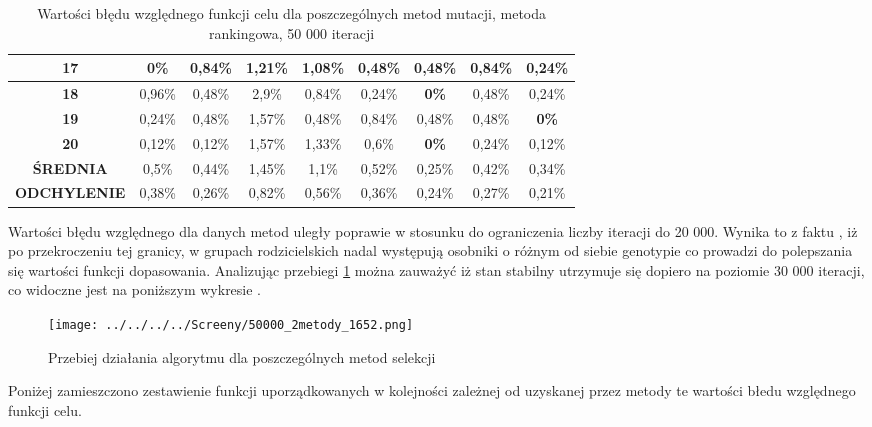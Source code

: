 \begin{itemize}
\begin{table}[h!]
\begin{center}
{\begin{tabular}{|c|c|c|c|c|c|c|c|c|}
\hline
 \textbf{17}&\color{green}\textbf{0\%}&0,84\%&1,21\%&1,08\%&0,48\%&0,48\%&0,84\%&0,24\%\\
\hline
 \textbf{18}&0,96\%&0,48\%&2,9\%&0,84\%&0,24\%&\color{green}\textbf{0\%}&0,48\%&0,24\%\\
\hline
 \textbf{19}&0,24\%&0,48\%&1,57\%&0,48\%&0,84\%&0,48\%&0,48\%&\color{green}\textbf{0\%}\\
\hline
 \textbf{20}&0,12\%&0,12\%&1,57\%&1,33\%&0,6\%&\color{green}\textbf{0\%}&0,24\%&0,12\%\\
\hline
 \textbf{ŚREDNIA}&0,5\%&0,44\%&1,45\%&1,1\%&0,52\%&0,25\%&0,42\%&0,34\%\\
\hline
 \textbf{ODCHYLENIE}&0,38\%&0,26\%&0,82\%&0,56\%&0,36\%&0,24\%&0,27\%&0,21\%\\
\hline
\end{tabular}}
\caption{Wartości błędu względnego funkcji celu dla poszczególnych metod mutacji, metoda rankingowa, 50 000 iteracji}
\label{rankingowa50}
\end{center}
\end{table}
\par

Wartości błędu względnego dla danych metod uległy poprawie w stosunku do ograniczenia liczby iteracji do 20 000. Wynika to z faktu , iż po przekroczeniu tej granicy, w grupach rodzicielskich nadal występują osobniki o różnym od siebie genotypie co prowadzi do polepszania się wartości funkcji dopasowania. Analizując przebiegi \ref{rankingowa50pic} można zauważyć iż stan stabilny utrzymuje się dopiero na poziomie 30 000 iteracji, co widoczne jest na poniższym wykresie .

\begin{figure}[h!]
		\texttt{[image: ../../../../Screeny/50000\_2metody\_1652.png]}
		\caption{Przebiej działania algorytmu dla poszczególnych metod selekcji}
		\label{rankingowa50pic}			
\end{figure}

Poniżej zamieszczono zestawienie funkcji uporządkowanych w kolejności zależnej od uzyskanej przez metody te wartości błedu względnego funkcji celu.


\end{itemize}
